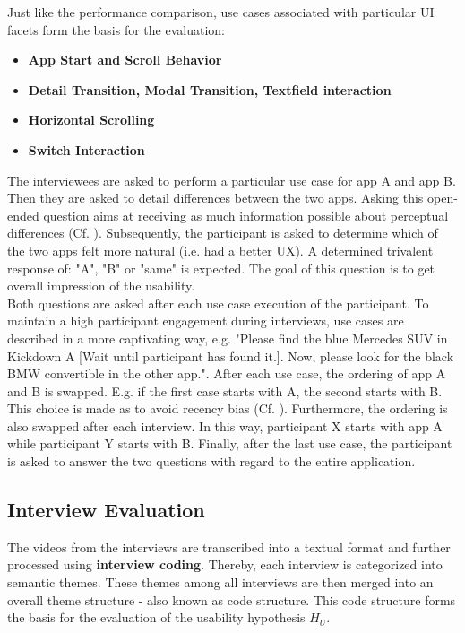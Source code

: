 Just like the performance comparison, use cases associated with particular UI facets form the basis for the evaluation:
\begin{itemize}
    \item \textbf{App Start and Scroll Behavior}
    \item \textbf{Detail Transition, Modal Transition, Textfield interaction}
    \item \textbf{Horizontal Scrolling}
    \item \textbf{Switch Interaction}
\end{itemize}
The interviewees are asked to perform a particular use case for app A and app B. Then they are asked to detail differences between the two apps.
Asking this open-ended question aims at receiving as much information possible about perceptual differences (Cf. \cite[182--185]{Helferrich2011}).
Subsequently, the participant is asked to determine which of the two apps felt more natural (i.e. had a better UX). A determined trivalent response of: "A", "B" or "same" is expected. 
The goal of this question is to get overall impression of the usability. \\
Both questions are asked after each use case execution of the participant. 
To maintain a high participant engagement during interviews, use cases are described in a more captivating way, e.g. "Please find the blue Mercedes SUV in Kickdown A [Wait until participant has found it.]. Now, 
please look for the black BMW convertible in the other app.". 
After each use case, the ordering of app A and B is swapped. E.g. if the first case starts with A, the second starts with B. This choice is made as to avoid recency bias (Cf. \cite{Atkinson1968}).
Furthermore, the ordering is also swapped after each interview. In this way, participant X starts with app A while participant Y starts with B.
Finally, after the last use case, the participant is asked to answer the two questions with regard to the entire application.


\subsection{Interview Evaluation} \label{section::interview_evaluation}
The videos from the interviews are transcribed into a textual format and further processed using \textbf{interview coding}. Thereby, each interview is categorized into semantic themes. These themes among
all interviews are then merged into an overall theme structure - also known as code structure. This code structure forms the basis for the evaluation of the usability hypothesis $H_U$. 
